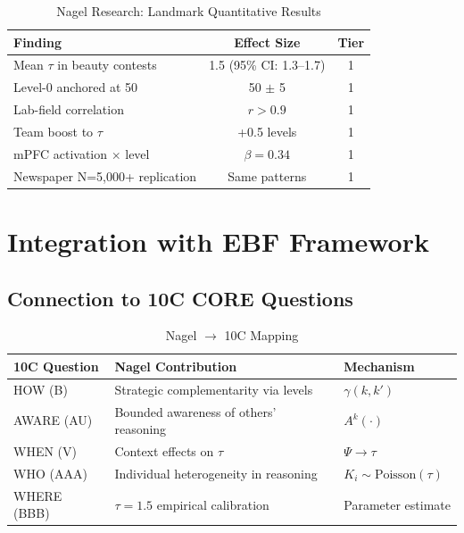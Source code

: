 \begin{table}[htbp]
\centering
\caption{Nagel Research: Landmark Quantitative Results}
\label{tab:nagel-results}
\renewcommand{\arraystretch}{1.3}
\small
\begin{tabular}{@{}p{5cm}cc@{}}
\toprule
\textbf{Finding} & \textbf{Effect Size} & \textbf{Tier} \\
\midrule
Mean $\tau$ in beauty contests & 1.5 (95\% CI: 1.3--1.7) & 1 \\
Level-0 anchored at 50 & 50 $\pm$ 5 & 1 \\
Lab-field correlation & $r > 0.9$ & 1 \\
Team boost to $\tau$ & +0.5 levels & 1 \\
mPFC activation $\times$ level & $\beta = 0.34$ & 1 \\
Newspaper N=5,000+ replication & Same patterns & 1 \\
\bottomrule
\end{tabular}
\end{table}

\section{Integration with EBF Framework}

\subsection{Connection to 10C CORE Questions}

\begin{table}[htbp]
\centering
\caption{Nagel $\rightarrow$ 10C Mapping}
\label{tab:nagel-9c}
\renewcommand{\arraystretch}{1.3}
\begin{tabular}{@{}lll@{}}
\toprule
\textbf{10C Question} & \textbf{Nagel Contribution} & \textbf{Mechanism} \\
\midrule
HOW (B) & Strategic complementarity via levels & $\gamma(k, k')$ \\
AWARE (AU) & Bounded awareness of others' reasoning & $A^k(\cdot)$ \\
WHEN (V) & Context effects on $\tau$ & $\Psi \rightarrow \tau$ \\
WHO (AAA) & Individual heterogeneity in reasoning & $K_i \sim \text{Poisson}(\tau)$ \\
WHERE (BBB) & $\tau = 1.5$ empirical calibration & Parameter estimate \\
\bottomrule
\end{tabular}
\end{table}

